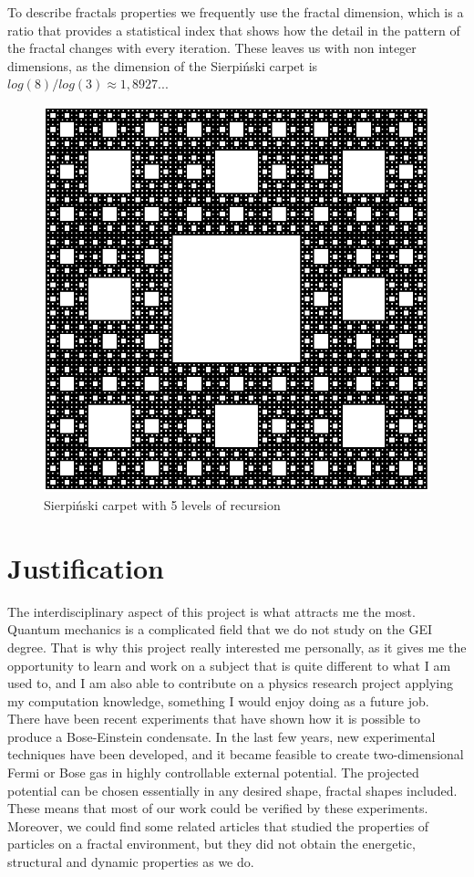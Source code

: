 \documentclass{article}
\begin{document}
To describe fractals properties we frequently use the fractal dimension, which is a ratio that 
provides a statistical index that shows how the detail in the pattern of the fractal changes
with every iteration. These leaves us with non integer dimensions, as the dimension of the 
Sierpiński carpet is $ log(8)/log(3)\approx 1,8927...$
\begin{figure}[h]
    \centering
    \includegraphics[scale=0.4]{./sierpinski.png}
    \caption{Sierpiński carpet with 5 levels of recursion}
\end{figure}
\vfill

\section{Justification}
The interdisciplinary aspect of this project is what attracts me the most. Quantum mechanics
is a complicated field that we do not study on the GEI degree. That is why this project 
really interested me personally, as it gives me the opportunity to learn and work on a 
subject that is quite different to what I am used to, and I am also able to contribute 
on a physics research project applying my computation knowledge, something I would enjoy
doing as a future job.\\

There have been recent experiments \cite{boseeinstein} that have shown how it is possible 
to produce a Bose-Einstein condensate. In the last few years, new experimental techniques 
have been developed, and it became feasible to create two-dimensional Fermi or Bose gas 
in highly controllable external potential. The projected potential can be chosen essentially 
in any desired shape, fractal shapes included. These means that most of our work could be 
verified by these experiments. Moreover, we could find some related articles that studied
the properties of particles on a fractal environment, but they did not obtain the energetic, 
structural and dynamic properties as we do.
\end{document}

